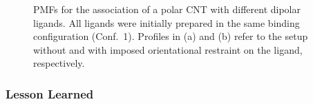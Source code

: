 \documentclass[9pt,lessons,pubversion]{livecoms}
\begin{document}
\begin{figure}[htb!]
  \centering    
  \caption{
  PMFs for the association of a polar CNT with different dipolar ligands. 
  All ligands were initially prepared in the same binding configuration (Conf.~1).
  Profiles in (a) and (b) refer to the setup without and with imposed orientational restraint on the ligand, respectively.
  }
  \label{fig:polCNT_polLig}
\end{figure}

\subsubsection*{Lesson Learned}
\end{document}

